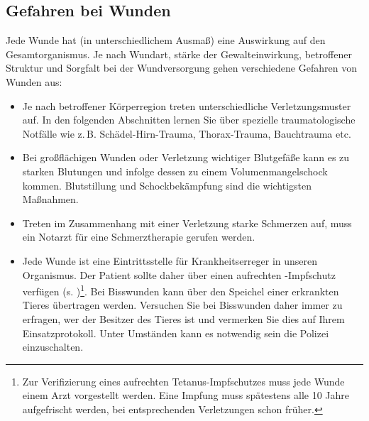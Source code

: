 \subsection{Gefahren bei Wunden}
Jede Wunde hat (in unterschiedlichem Ausmaß) eine Auswirkung auf den
Gesamtorganismus. Je nach Wundart, stärke der Gewalteinwirkung, betroffener
Struktur und Sorgfalt bei der Wundversorgung gehen verschiedene Gefahren von
Wunden aus:
\begin{itemize}
  \item {} Je nach
  betroffener Körperregion treten unterschiedliche Verletzungsmuster auf.  In
  den folgenden Abschnitten lernen Sie über spezielle traumatologische Notfälle
  wie z.\,B. Schädel-Hirn-Trauma, Thorax-Trauma, Bauchtrauma etc.
  \item {} Bei großflächigen Wunden oder Verletzung wichtiger
  Blutgefäße kann es zu starken Blutungen und infolge dessen zu einem 
  Volumenmangelschock kommen. Blutstillung und Schockbekämpfung sind  die
  wichtigsten Maßnahmen.
  \item {} Treten im Zusammenhang mit einer Verletzung 
  starke Schmerzen auf, muss ein Notarzt für eine Schmerztherapie gerufen werden.
  \item {} Jede Wunde ist eine
  Eintrittsstelle für Krankheitserreger in unseren Organismus. Der Patient
  sollte daher über einen aufrechten -Impfschutz verfügen 
  (s. )\footnote{Zur Verifizierung eines
  aufrechten Tetanus-Impfschutzes muss jede Wunde einem Arzt vorgestellt
  werden.  Eine Impfung muss spätestens alle 10 Jahre aufgefrischt werden,  bei
  entsprechenden Verletzungen schon früher.\cite{BoehmerTaschRett6}}.  Bei
  Bisswunden kann über den Speichel einer erkrankten Tieres 
  übertragen werden.  Versuchen Sie bei Bisswunden daher immer zu erfragen, wer der
  Besitzer des  Tieres ist und vermerken Sie dies auf Ihrem Einsatzprotokoll.
  Unter  Umständen kann es notwendig sein die Polizei einzuschalten.
\end{itemize}






